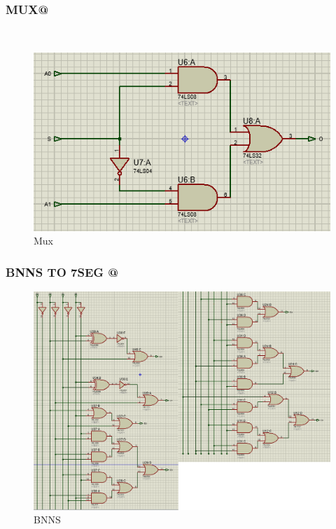 \documentclass{article}
\begin{document}
\subsubsection{MUX@} 
\begin{figure}[!h]
    \centering
    \includegraphics[scale=0.75]{Mux.PNG}
    \caption{Mux}
    \label{fig:Mux}
\end{figure}

\subsubsection{BNNS TO 7SEG @}
\begin{figure}[!h]
    \centering
    \includegraphics[scale =0.5]{BNSS.PNG}
    \caption{BNNS}
    \label{fig:BNNS}
\end{figure}
\newpage
\end{document}

